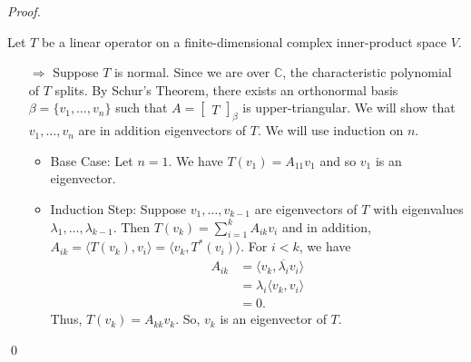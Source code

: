 \documentclass[12pt]{article}
\newenvironment{sol}
    {\emph{Proof.}
    }
    {
    \qed
    }
\begin{document}
\begin{sol}
Let $T$ be a linear operator on a finite-dimensional complex inner-product space $V$.

\begin{itemize}
    \item[$\Longrightarrow$] Suppose $T$ is normal. Since we are over $\mathbb{C}$, the characteristic polynomial of $T$ splits. By Schur's Theorem, there exists an orthonormal basis $\beta = \{v_1, \dots, v_n \}$ such that $A = \begin{bmatrix}
    T
    \end{bmatrix}_\beta$ is upper-triangular. We will show that $v_1, \dots, v_n$ are in addition eigenvectors of $T$. We will use induction on $n$. 
    
    \begin{itemize}
        \item Base Case: Let $n = 1$. We have $T(v_1) = A_{11}v_1$ and so $v_1$ is an eigenvector. 
        
        \item Induction Step: Suppose $v_1, \dots, v_{k-1}$ are eigenvectors of $T$ with eigenvalues \newline $\lambda_1, \dots, \lambda_{k-1}$. Then $T(v_k) = \sum_{i = 1}^kA_{ik}v_i$ and in addition, $A_{ik} = \langle T(v_k), v_i \rangle = \langle v_k, T^*(v_i) \rangle$. For $i < k$, we have \begin{align*}
            A_{ik} &= \langle v_k, \overline{\lambda_i}v_i \rangle \\
            &= \lambda_i \langle v_k, v_i \rangle \\
            &= 0.
        \end{align*} Thus, $T(v_k) = A_{kk}v_k$. So, $v_k$ is an eigenvector of $T$.
    \end{itemize}
    

\end{itemize}
\end{sol}
\end{document}
